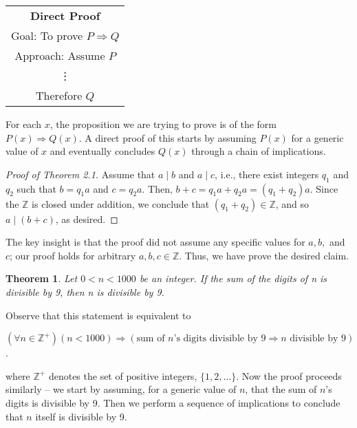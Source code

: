 \documentclass[12pt,a4paper]{article}
\newtheorem{theorem}{Theorem}[section]
\theoremstyle{definition}
\begin{document}
\begin{center}
	\begin{tabular}{|c|}
	\hline 
	\rule[-1ex]{0pt}{2.5ex} \textbf{Direct Proof}\\ 
	\rule[-1ex]{0pt}{2.5ex} Goal: To prove $P\Rightarrow Q$ \\ 
	\rule[-1ex]{0pt}{2.5ex} Approach: Assume $P$  \\ 
	\rule[-1ex]{0pt}{2.5ex} \vdots \\ 
	\rule[-1ex]{0pt}{2.5ex} Therefore $Q$ \\ 
	\hline
\end{tabular} 
\end{center}

For each $x$, the proposition we are trying to prove is of the form $P(x)\Rightarrow Q(x)$. A direct proof of this starts by assuming $P(x)$ for a generic value of $x$ and eventually concludes $Q(x)$ through a chain of implications.

\begin{proof}[Proof of Theorem 2.1]
Assume that $a\mid b$ and $a\mid c$, i.e., there exist integers $q_1$ and $q_2$ such that $b=q_1a$ and $c=q_2a$. Then, $b+c=q_1a+q_2a=(q_1+q_2)a$. Since the $\mathbb{Z}$ is closed under addition, we conclude that $(q_1+q_2)\in\mathbb{Z}$, and so $a\mid(b+c)$, as desired.
\end{proof}

The key insight is that the proof did not assume any specific values for $a,b,$ and $c$; our proof holds for arbitrary $a,b,c\in\mathbb{Z}$. Thus, we have prove the desired claim.

\begin{theorem}\label{thm2.2}
Let $0<n<1000$ be an integer. If the sum of the digits of n is divisible by 9, then n is divisible by 9.
\end{theorem}

\bigbreak

Observe that this statement is equivalent to 
\begin{center}
	$(\forall n\in\mathbb{Z}^{+})(n<1000)\Rightarrow(\text{sum of }n\text{'s digits divisible by }9\Rightarrow n \text{ divisible by 9})$.
\end{center}
where $\mathbb{Z}^{+}$ denotes the set of positive integers, $\{1,2,\dots\}$. Now the proof proceeds similarly -- we start by assuming, for a generic value of $n$, that the sum of $n$'s digits is divisible by 9. Then we perform a sequence of implications to conclude that $n$ itself is divisible by 9.
\end{document}
